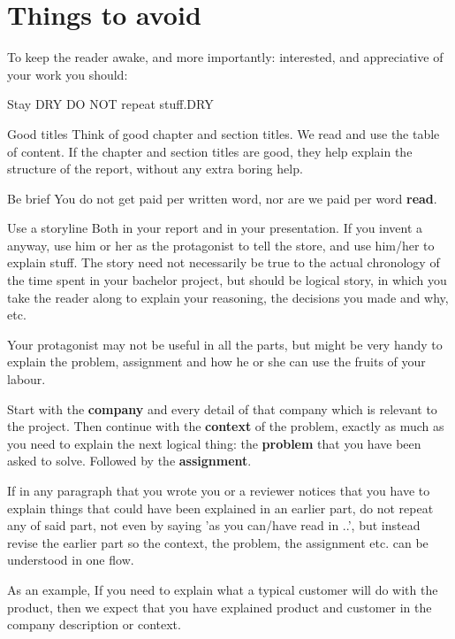 \section{Things to avoid}
To keep the reader awake, and more importantly: interested, and appreciative of your work you should:
\begin{Description}
\item[Stay DRY] DO NOT repeat stuff.\gls{DRY}
\item[Good titles] Think of good chapter and section titles. We read
  and use the table of content. If the chapter and section titles are
  good, they help explain the structure of the report, without any
  extra boring help.
\item[Be brief] You do not get paid per written word, nor are we paid per word \textbf{read}.
\item[Use a storyline] Both in your report and in your
  presentation. If you invent a  anyway, use him or her as the
  protagonist to tell the store, and use him/her to explain stuff. 
The story need not necessarily be true to the actual chronology of the
time spent in your bachelor project, but should be logical story, in
which you take the reader along to explain your reasoning, the
decisions you made and why, etc. 
\end{Description}

Your protagonist may not be useful in all the parts, but might be very
handy to explain the problem, assignment and how he or she can use the
fruits of your labour.

Start with the \textbf{company} and every detail of that company which is relevant to the project.
Then continue with the \textbf{context} of the problem, exactly as
much as you need to explain the next logical thing: the
\textbf{problem} that you have been asked to solve. Followed by the
\textbf{assignment}.

If in any paragraph that you wrote you or a reviewer notices that you
have to explain things that could have been explained in an earlier
part, do not repeat any of said part, not even by saying 'as you
can/have read in ..', but instead revise the earlier part so the
context, the problem, the assignment etc. can be understood in one
flow.

As an example, If you need to explain what a typical customer will do
with the product, then we expect that you have explained product and
customer in the company description or context.

